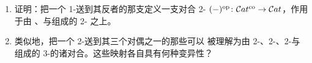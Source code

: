 \begin{exercise}\label{ex:involutive-op-and-duals}
\begin{enumerate}[label=(\roman*)]
\item 证明：把一个 1-\trCategory{}送到其反者的那支\trFunctor{}定义一支对合
  2-\trFunctor{} $(-)^{\mathrm{op}}\colon\mathcal{C}at^{\mathrm{co}}\to\mathcal{C}at$，作用于由%
  \trCategory、\trFunctor{}与\trNaturalTransformation{}组成的 2-\trCategory{}%
  之上。
\item 类似地，把一个 2-\trCategory{}送到其三个对偶之一的那些\trFunctor{}可以
  被理解为由 2-\trCategory、2-\trFunctor、2-\trNaturalTransformation{}与%
  \trModification{}组成的 3-\trCategory{}的诸对合。这些映射各自具有何种变异性？
\end{enumerate}
\end{exercise}


